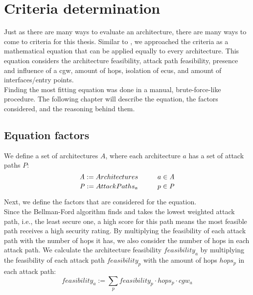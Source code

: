 \chapter{Criteria determination}
\label{chp:criteria}

Just as there are many ways to evaluate an architecture, there are many ways to come to criteria for this thesis.
Similar to \cite{threat_surf}, we approached the criteria as a mathematical equation that can be applied equally to every architecture.
This equation considers the architecture feasibility, attack path feasibility, presence and influence of a \acrshort{cgw},
amount of hops, isolation of \acrshort{ecu}s, and amount of interfaces/entry points.\\

Finding the most fitting equation was done in a manual, brute-force-like procedure.
The following chapter will describe the equation, the factors considered, and the reasoning behind them.\\

\section{Equation factors}
\label{sec:equation_factors}

We define a set of architectures $\mathit{A}$, where each architecture $a$ has a set of attack paths $\mathit{P}$:\\
\begin{equation}
    \mathit{A} := {Architectures} \hspace*{1cm} a \in \mathit{A} \label{eq:architectures}
\end{equation}
\begin{equation}
    \mathit{P} := {Attack Paths_{a}} \hspace*{1cm} p \in \mathit{P} \label{eq:attack_paths}
\end{equation}

\hfill \break

Next, we define the factors that are considered for the equation.\\

Since the Bellman-Ford algorithm finds and takes the lowest weighted attack path, i.e., the least secure one, 
a high score for this path means the most feasible path receives a high security rating.
By multiplying the feasibility of each attack path with the number of hops it has, we also consider the number of hops in each attack path.
We calculate the architecture feasibility $feasibility_{a}$ by multiplying the feasibility of each attack path $feasibility_{p}$ with the amount of hops $hops_{p}$ in each attack path:
\begin{equation}
    feasibility_{a} := \sum_{p} feasibility_{p} \cdot  hops_{p} \cdot  cgw_{a} \label{eq:feasibility}
\end{equation}

